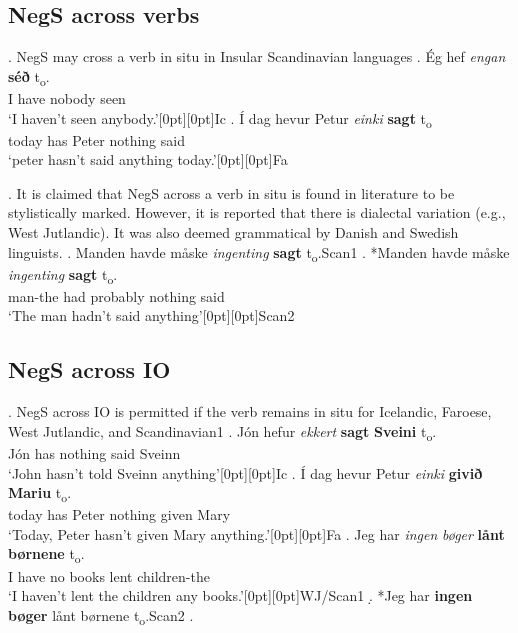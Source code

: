 \documentclass[12pt, letterpaper]{article}
\newcommand{\rcommentg}[1]{\hfill\raisebox{1.9\baselineskip}[0pt][0pt]{#1}} %
\begin{document}
\subsection{NegS across verbs}

\ex. NegS may cross a verb in situ in Insular Scandinavian languages
\ag. Ég hef \textit{engan} \textbf{séð} t\textsubscript{o}. \\
I have nobody seen\\
`I haven't seen anybody.'\rcommentg{Ic}
\bg. {Í dag} hevur Petur \textit{einki} \textbf{sagt} t\textsubscript{o}\\
today has Peter nothing said\\
`peter hasn't said anything today.'\rcommentg{Fa}

\ex. It is claimed that NegS across a verb in situ is found in literature to be stylistically marked. However, it is reported that there is dialectal variation (e.g., West Jutlandic). It was also deemed grammatical by Danish and Swedish linguists.
\a. Manden havde måske \textit{ingenting} \textbf{sagt} t\textsubscript{o}.\hfill Scan1
\bg. *Manden havde måske \textit{ingenting} \textbf{sagt} t\textsubscript{o}.\\
man-the had probably nothing said\\
`The man hadn't said anything'\rcommentg{Scan2}


\subsection{NegS across IO}

\ex. NegS across IO is permitted if the verb remains in situ for Icelandic, Faroese, West Jutlandic, and Scandinavian1
\ag. Jón hefur \textit{ekkert} \textbf{sagt} \textbf{Sveini} t\textsubscript{o}. \\
Jón has nothing said Sveinn\\
`John hasn't told Sveinn anything'\rcommentg{Ic}
\bg. {Í dag} hevur Petur \textit{einki} \textbf{givið} \textbf{Mariu} t\textsubscript{o}. \\
today has Peter nothing given Mary\\
`Today, Peter hasn't given Mary anything.'\rcommentg{Fa}
\cg. Jeg har \textit{ingen} \textit{bøger} \textbf{lånt} \textbf{børnene} t\textsubscript{o}.\\
I have no books lent children-the\\
`I haven't lent the children any books.'\rcommentg{WJ/Scan1}
\d. *Jeg har \textbf{ingen bøger} lånt børnene t\textsubscript{o}.\hfill Scan2
\z.
\end{document}
